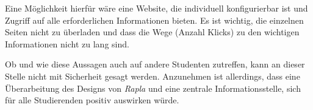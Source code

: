 Eine Möglichkeit hierfür wäre eine Website, die individuell konfigurierbar ist und Zugriff auf alle erforderlichen Informationen bieten. Es ist wichtig, die einzelnen Seiten nicht zu überladen und dass die Wege (Anzahl Klicks) zu den wichtigen Informationen nicht zu lang sind.

Ob und wie diese Aussagen auch auf andere Studenten zutreffen, kann an dieser Stelle nicht mit Sicherheit gesagt werden. Anzunehmen ist allerdings, dass eine Überarbeitung des Designs von \emph{Rapla} und eine zentrale Informationsstelle, sich für alle Studierenden positiv auswirken würde.